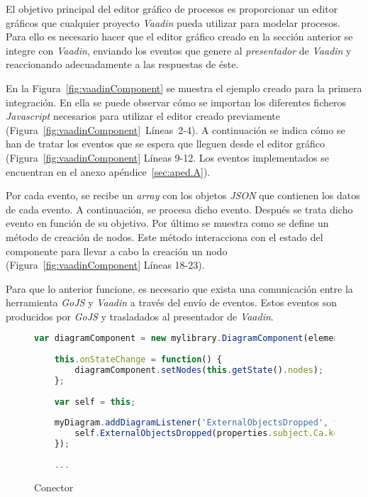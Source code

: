 El objetivo principal del editor gráfico de procesos es proporcionar un editor gráficos que cualquier proyecto \emph{Vaadin} pueda utilizar para modelar procesos. Para ello es necesario hacer que el editor gráfico creado en la sección anterior se integre con \emph{Vaadin}, enviando los eventos que genere al \emph{presentador} de \emph{Vaadin} y reaccionando adecuadamente a las respuestas de éste. 

En la Figura~\ref{fig:vaadinComponent} se muestra el ejemplo creado para la primera integración. En ella se puede observar cómo se importan los diferentes ficheros \emph{Javascript} necesarios para utilizar el editor creado previamente (Figura~\ref{fig:vaadinComponent}~Líneas~2-4). A continuación se indica cómo se han de tratar los eventos que se espera que lleguen desde el editor gráfico (Figura~\ref{fig:vaadinComponent} Líneas 9-12. Los eventos implementados se encuentran en el anexo apéndice~\ref{sec:aped.A}). 


Por cada evento, se recibe un \emph{array} con los objetos \emph{JSON} que contienen los datos de cada evento. A continuación, se procesa dicho evento. Después se trata dicho evento en función de su objetivo. 
Por último se muestra como se define un método de creación de nodos. Este método interacciona con el estado del componente para llevar a cabo la creación un nodo (Figura~\ref{fig:vaadinComponent} Líneas 18-23).

Para que lo anterior funcione, es necesario que exista una comunicación entre la herramienta \emph{GoJS} y \emph{Vaadin} a través del envío de eventos. Estos eventos son producidos por \emph{GoJS} y trasladados al presentador de \emph{Vaadin}.

\begin{figure}[H]
	\centering
	\begin{lstlisting}[language=Javascript]
	var diagramComponent = new mylibrary.DiagramComponent(element);
	
	this.onStateChange = function() {
		diagramComponent.setNodes(this.getState().nodes);
	};
	
	var self = this;
	
	myDiagram.addDiagramListener('ExternalObjectsDropped', function(properties) {
		self.ExternalObjectsDropped(properties.subject.Ca.key.Vd);
	});
	
	...\end{lstlisting}
	\caption{Conector}
	\label{fig:connector}
\end{figure}

